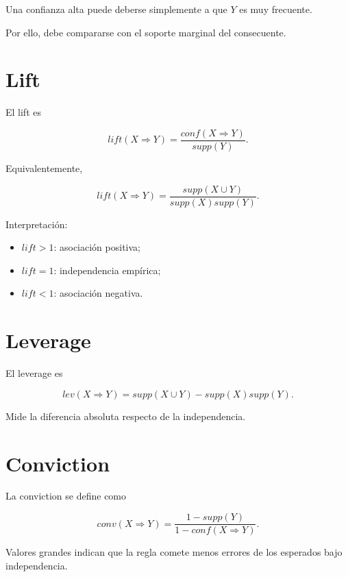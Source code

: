 \documentclass[
  spanish,
  10.5pt,
  letterpaper,
  DIV=11,
  numbers=noendperiod,
  oneside,
  open=any]{scrreprt}
\providecommand{\tightlist}{%
  \setlength{\itemsep}{0pt}\setlength{\parskip}{0pt}}
\theoremstyle{definition}
\theoremstyle{definition}
\theoremstyle{plain}
\theoremstyle{remark}
\begin{document}

Una confianza alta puede deberse simplemente a que \(Y\) es muy
frecuente.

Por ello, debe compararse con el soporte marginal del consecuente.

\section*{Lift}\label{lift}


El lift es

\[
lift(X\Rightarrow Y)
=
\frac{conf(X\Rightarrow Y)}{supp(Y)}.
\]

Equivalentemente,

\[
lift(X\Rightarrow Y)
=
\frac{supp(X\cup Y)}
{supp(X)supp(Y)}.
\]

Interpretación:

\begin{itemize}
\tightlist
\item
  \(lift>1\): asociación positiva;
\item
  \(lift=1\): independencia empírica;
\item
  \(lift<1\): asociación negativa.
\end{itemize}

\section*{Leverage}\label{leverage}


El leverage es

\[
lev(X\Rightarrow Y)
=
supp(X\cup Y)
-
supp(X)supp(Y).
\]

Mide la diferencia absoluta respecto de la independencia.

\section*{Conviction}\label{conviction}


La conviction se define como

\[
conv(X\Rightarrow Y)
=
\frac{1-supp(Y)}
{1-conf(X\Rightarrow Y)}.
\]

Valores grandes indican que la regla comete menos errores de los
esperados bajo independencia.
\end{document}
